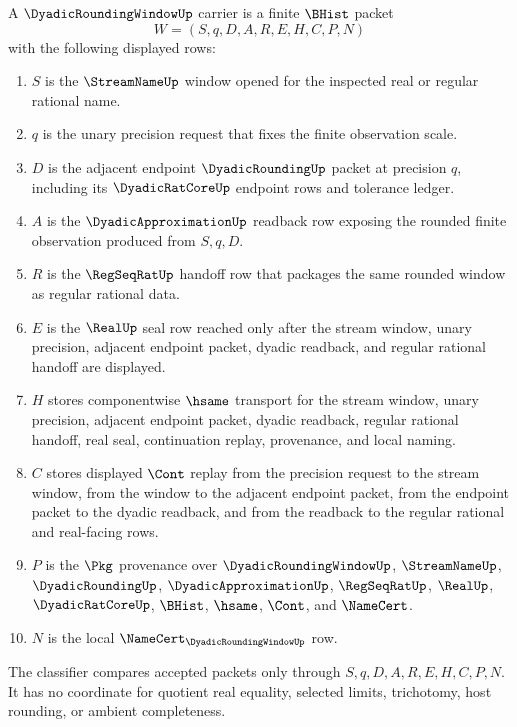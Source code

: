 \begin{definition}
\label{def:dyadic-rounding-window-carrier}
A $\DyadicRoundingWindowUp$ carrier is a finite $\BHist$ packet
$$
W=(S,q,D,A,R,E,H,C,P,N)
$$
with the following displayed rows:
\begin{enumerate}
\item $S$ is the $\StreamNameUp$ window opened for the inspected real or regular rational name.
\item $q$ is the unary precision request that fixes the finite observation scale.
\item $D$ is the adjacent endpoint $\DyadicRoundingUp$ packet at precision $q$, including its $\DyadicRatCoreUp$ endpoint rows and tolerance ledger.
\item $A$ is the $\DyadicApproximationUp$ readback row exposing the rounded finite observation produced from $S,q,D$.
\item $R$ is the $\RegSeqRatUp$ handoff row that packages the same rounded window as regular rational data.
\item $E$ is the $\RealUp$ seal row reached only after the stream window, unary precision, adjacent endpoint packet, dyadic readback, and regular rational handoff are displayed.
\item $H$ stores componentwise $\hsame$ transport for the stream window, unary precision, adjacent endpoint packet, dyadic readback, regular rational handoff, real seal, continuation replay, provenance, and local naming.
\item $C$ stores displayed $\Cont$ replay from the precision request to the stream window, from the window to the adjacent endpoint packet, from the endpoint packet to the dyadic readback, and from the readback to the regular rational and real-facing rows.
\item $P$ is the $\Pkg$ provenance over $\DyadicRoundingWindowUp$, $\StreamNameUp$, $\DyadicRoundingUp$, $\DyadicApproximationUp$, $\RegSeqRatUp$, $\RealUp$, $\DyadicRatCoreUp$, $\BHist$, $\hsame$, $\Cont$, and $\NameCert$.
\item $N$ is the local $\NameCert_{\DyadicRoundingWindowUp}$ row.
\end{enumerate}
The classifier compares accepted packets only through $S,q,D,A,R,E,H,C,P,N$. It has no coordinate for quotient real equality, selected limits, trichotomy, host rounding, or ambient completeness.
\end{definition}

